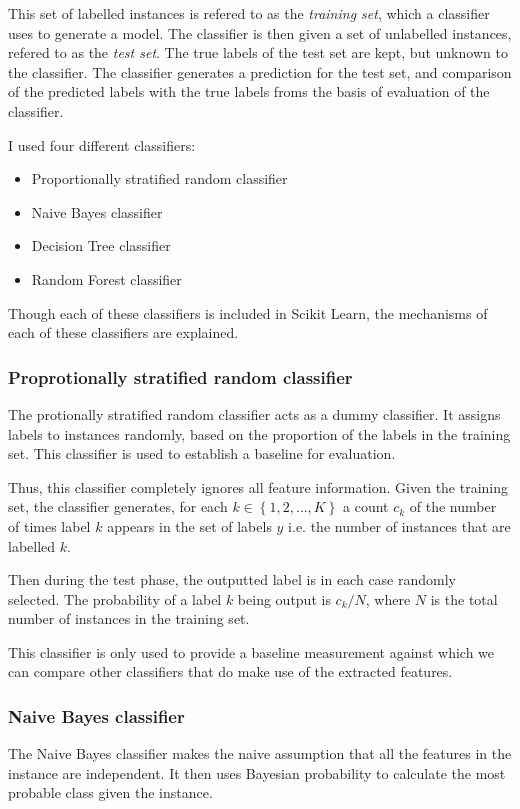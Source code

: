      This set of labelled instances is refered to as the \emph{training set}, which a classifier uses to generate a model. The classifier is then given a set of unlabelled instances, refered to as the \emph{test set}. The true labels of the test set are kept, but unknown to the classifier. The classifier generates a prediction for the test set, and comparison of the predicted labels with the true labels froms the basis of evaluation of the classifier.
      
      I used four different classifiers:
      \begin{itemize}
        \item Proportionally stratified random classifier
        \item Naive Bayes classifier
        \item Decision Tree classifier
        \item Random Forest classifier
      \end{itemize}
      
      Though each of these classifiers is included in Scikit Learn, the mechanisms of each of these classifiers are explained.
      
      \subsubsection{Proprotionally stratified random classifier}
        The protionally stratified random classifier acts as a dummy classifier. It assigns labels to instances randomly, based on the proportion of the labels in the training set. This classifier is used to establish a baseline for evaluation.
        
        Thus, this classifier completely ignores all feature information. Given the training set, the classifier generates, for each $k \in \left\{1, 2, \dots, K\right\}$  a count $c_k$ of the number of times label $k$ appears in the set of labels $y$ i.e. the number of instances that are labelled $k$.
        
        Then during the test phase, the outputted label is in each case randomly selected. The probability of a label $k$ being output is $c_k / N$, where $N$ is the total number of instances in the training set.
        
        This classifier is only used to provide a baseline measurement against which we can compare other classifiers that do make use of the extracted features.
        
      \subsubsection{Naive Bayes classifier}
        The Naive Bayes classifier makes the naive assumption that all the features in the instance are independent. It then uses Bayesian probability to calculate the most probable class given the instance. 
        
